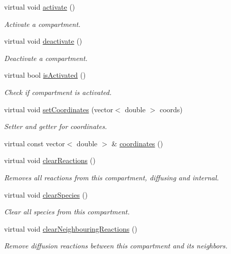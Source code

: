 \begin{DoxyCompactItemize}
virtual void \hyperlink{classCompartment_a010db2fb85e77af1c48563f60517b4cc}{activate} ()
\begin{DoxyCompactList}\small\item\em Activate a compartment. \end{DoxyCompactList}\item 
virtual void \hyperlink{classCompartment_a664066790b959536c4a6ef47f11a139d}{deactivate} ()
\begin{DoxyCompactList}\small\item\em Deactivate a compartment. \end{DoxyCompactList}\item 
virtual bool \hyperlink{classCompartment_aa5cda379f9cdc7568d2006115e5836ea}{is\+Activated} ()
\begin{DoxyCompactList}\small\item\em Check if compartment is activated. \end{DoxyCompactList}\item 
virtual void \hyperlink{classCompartment_a53ffa734f488ad20d02fcf5a38efb024}{set\+Coordinates} (vector$<$ double $>$ coords)
\begin{DoxyCompactList}\small\item\em Setter and getter for coordinates. \end{DoxyCompactList}\item 
virtual const vector$<$ double $>$ \& \hyperlink{classCompartment_aee0c442e684f69eae8a021c28aa5fadf}{coordinates} ()
\item 
virtual void \hyperlink{classCompartment_a4201fd3e431643d183b6afd586540d29}{clear\+Reactions} ()
\begin{DoxyCompactList}\small\item\em Removes all reactions from this compartment, diffusing and internal. \end{DoxyCompactList}\item 
virtual void \hyperlink{classCompartment_a4db53aff27637cd9bba72d097dd57c39}{clear\+Species} ()
\begin{DoxyCompactList}\small\item\em Clear all species from this compartment. \end{DoxyCompactList}\item 
virtual void \hyperlink{classCompartment_af1827a8dc6ef0531ff72b49dc0832368}{clear\+Neighbouring\+Reactions} ()
\begin{DoxyCompactList}\small\item\em Remove diffusion reactions between this compartment and its neighbors. \end{DoxyCompactList}\item 

\end{DoxyCompactItemize}
